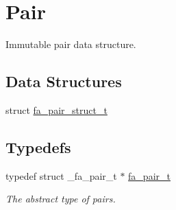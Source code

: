 \hypertarget{group___fa_pair}{\section{Pair}
\label{group___fa_pair}
}


Immutable pair data structure.  


\subsection*{Data Structures}
\begin{DoxyCompactItemize}
\item 
struct \hyperlink{structfa__pair__struct__t}{fa\-\_\-pair\-\_\-struct\-\_\-t}
\end{DoxyCompactItemize}
\subsection*{Typedefs}
\begin{DoxyCompactItemize}
\item 
typedef struct \-\_\-fa\-\_\-pair\-\_\-t $\ast$ \hyperlink{group___fa_pair_gac2b2e58c230bac4f8a63ef6c05072680}{fa\-\_\-pair\-\_\-t}
\begin{DoxyCompactList}\small\item\em The abstract type of pairs. \end{DoxyCompactList}\end{DoxyCompactItemize}
